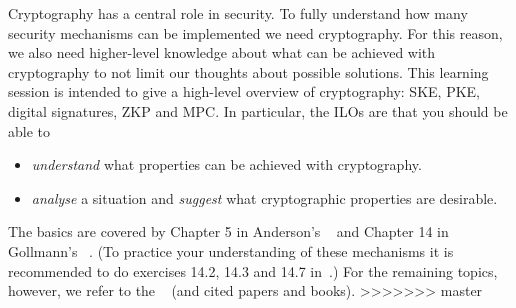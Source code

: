 Cryptography has a central role in security.
To fully understand how many security mechanisms can be implemented we need 
cryptography.
For this reason, we also need higher-level knowledge about what can be achieved 
with cryptography to not limit our thoughts about possible solutions.
This learning session is intended to give a high-level overview of 
cryptography: \ac{SKE}, \ac{PKE}, digital signatures, \ac{ZKP} and \ac{MPC}.
In particular, the \acp{ILO} are that you should be able to
\begin{itemize}
  \item \emph{understand} what properties can be achieved with cryptography.
  \item \emph{analyse} a situation and \emph{suggest} what cryptographic 
    properties are desirable.
\end{itemize}

The basics are covered by
Chapter 5 in Anderson's ~\cite{Anderson2008sea} and
Chapter 14 in Gollmann's ~\cite{Gollmann2011cs}.
(To practice your understanding of these mechanisms it is recommended to do 
exercises 14.2, 14.3 and 14.7 in~\cite{Gollmann2011cs}.)
For the remaining topics, however, we refer to the ~\cite{EOCS} 
(and cited papers and books).
>>>>>>> master
